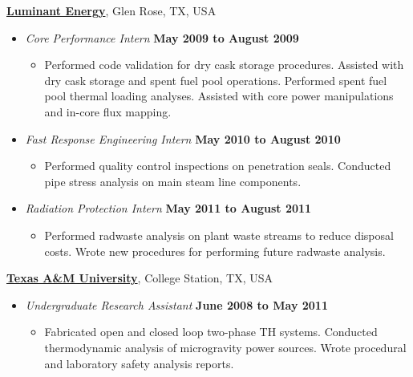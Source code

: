 \documentclass[10pt]{article}
\newenvironment{outerlist}[1][\enskip\textbullet]%
        {\begin{itemize}[#1,leftmargin=*]}{\end{itemize}%
         \vspace{-.6\baselineskip}}
\newenvironment{innerlist}[1][\enskip\textbullet]%
        {\begin{itemize}[#1,leftmargin=*,parsep=0pt,itemsep=0pt,topsep=0pt,partopsep=0pt]}
        {\end{itemize}}
\newcommand{\halfblankline}{\quad\vspace{-0.5\baselineskip}\pagebreak[3]}
\begin{document}
\textbf{\href{https://www.luminant.com/}{Luminant Energy}},
Glen Rose, TX, USA
\begin{outerlist}

\item[] \textit{Core Performance Intern}%
        \hfill \textbf{May 2009 to August 2009}
\begin{innerlist}
\item[] Performed code validation for dry cask storage procedures. Assisted with dry cask storage and spent fuel pool operations. Performed spent fuel pool thermal loading analyses. Assisted with core power manipulations and in-core flux mapping.
\end{innerlist}

\item[] \textit{Fast Response Engineering Intern}%
        \hfill \textbf{May 2010 to August 2010}
\begin{innerlist}
\item[] Performed quality control inspections on penetration seals. Conducted pipe stress analysis on main steam line components.
\end{innerlist}

\item[] \textit{Radiation Protection Intern}%
        \hfill \textbf{May 2011 to August 2011}
\begin{innerlist}
\item[] Performed radwaste analysis on plant waste streams to reduce disposal costs. Wrote new procedures for performing future radwaste analysis.
\end{innerlist}

\end{outerlist}

\halfblankline

\textbf{\href{https://www.tamu.edu/}{Texas A\&M University}},
College Station, TX, USA
\begin{outerlist}

\item[] \textit{Undergraduate Research Assistant}%
        \hfill \textbf{June 2008 to May 2011}
\begin{innerlist}
\item[] Fabricated open and closed loop two-phase TH systems. Conducted thermodynamic analysis of microgravity power sources. Wrote procedural and laboratory safety analysis reports.
\end{innerlist}

\end{outerlist}
\end{document}
